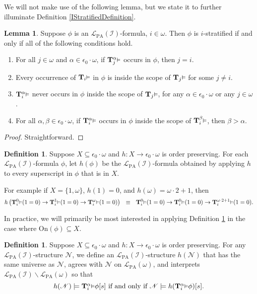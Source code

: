 \documentclass[reqno]{article}
\theoremstyle{definition}
\newtheorem{lemma}[theorem]{Lemma}
\newtheorem{definition}[theorem]{Definition}
\def\L{\mathscr{L}}
\def\T{\mathbf{T}}
\def\LPA{\L_{\mathrm{PA}}}
\def\epom{\epsilon_0\cdot\omega}
\def\indset{\mathcal I}
\def\onset{\mathrm{On}}
\renewcommand{\Pr}[1]{\T_{#1}\mbox{\small${\vDash}$}}
\newcommand{\Prr}[2]{\T^{#1}_{#2}\mbox{\small${\vDash}$}}
\begin{document}
We will not make use of the following lemma, but we state it to further illuminate
Definition \ref{IStratifiedDefinition}.

\begin{lemma}
Suppose $\phi$ is an $\LPA(\indset)$-formula, $i\in\omega$.
Then $\phi$ is $i$-stratified if and only if all of the following conditions hold.
\begin{enumerate}
    \item
    For all $j\in\omega$ and $\alpha\in\epom$, if $\Prr\alpha j$ occurs in $\phi$,
    then $j=i$.
    \item
    Every occurrence of $\Pr i$ in $\phi$ is inside the scope of $\Pr j$ for some
    $j\not=i$.
    \item
    $\Prr\alpha i$ never occurs in $\phi$ inside the scope of $\Pr j$, for any
    $\alpha\in\epom$ or any $j\in\omega$.
    \item
    For all $\alpha,\beta\in\epom$,
    if $\Prr\alpha i$ occurs in $\phi$ inside the scope of $\Prr\beta i$,
    then $\beta>\alpha$.
\end{enumerate}
\end{lemma}

\begin{proof}
Straightforward.
\end{proof}

\begin{definition}
\label{applyinghtophi}
Suppose $X\subseteq\epom$ and $h:X\to \epom$ is order preserving.
For each $\LPA(\indset)$-formula $\phi$,
let $h(\phi)$ be the $\LPA(\indset)$-formula obtained by applying $h$
to every superscript in $\phi$
that is in $X$.
\end{definition}

For example if $X=\{1,\omega\}$, $h(1)=0$, and $h(\omega)=\omega\cdot 2+1$,
then
\[
h\left(\Prr0i(1=0)\rightarrow\Prr1i(1=0)\rightarrow\Prr{\omega} i(1=0)\right)
\,\,\,\,\equiv\,\,\,\,
\Prr0i(1=0)\rightarrow\Prr0i(1=0)\rightarrow\Prr{\omega\cdot 2+1}i(1=0).
\]

In practice, we will primarily be most interested in applying
Definition \ref{applyinghtophi} in the case where $\onset(\phi)\subseteq X$.

\begin{definition}
Suppose $X\subseteq\epom$ and $h:X\to\epom$ is order preserving.
For any $\LPA(\indset)$-structure $\mathscr N$,
we define an $\LPA(\indset)$-structure $h(\mathscr N)$ that
has the same universe as $\mathscr N$,
agrees with $\mathscr N$ on $\LPA(\omega)$, and
interprets $\LPA(\indset)\backslash\LPA(\omega)$
so that
\[
\mbox{$h(\mathscr N)\models \Prr\alpha i\phi[s]$
if and only if $\mathscr N\models h(\Prr\alpha i\phi)[s]$.}
\]
\end{definition}
\end{document}
